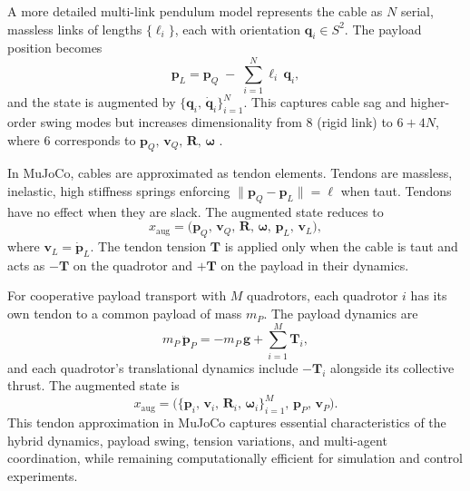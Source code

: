 A more detailed multi-link pendulum model represents the cable as \(N\) serial, massless links of lengths \(\{\ell_{i}\}\), each with orientation \(\mathbf{q}_{i}\in S^{2}\). The payload position becomes
\[
\mathbf{p}_{L} 
= \mathbf{p}_{Q} \;-\; \sum_{i=1}^{N}\ell_{i}\,\mathbf{q}_{i},
\]
and the state is augmented by \(\{\mathbf{q}_{i},\,\dot{\mathbf{q}}_{i}\}_{i=1}^{N}\). This captures cable sag and higher-order swing modes but increases dimensionality from 8 (rigid link) to \(6 + 4N\), where 6 corresponds to \(\mathbf{p}_{Q},\,\mathbf{v}_{Q},\,\mathbf{R},\,\boldsymbol{\omega}\) \cite{goodarzi_dynamics_2015}.

In MuJoCo, cables are approximated as tendon elements. Tendons are massless, inelastic, high stiffness springs enforcing \(\|\mathbf{p}_{Q}-\mathbf{p}_{L}\| = \ell\) when taut. Tendons have no effect when they are slack. The augmented state reduces to
\[
x_{\mathrm{aug}} 
= \bigl(\mathbf{p}_{Q},\,\mathbf{v}_{Q},\,\mathbf{R},\,\boldsymbol{\omega},\,\mathbf{p}_{L},\,\mathbf{v}_{L}\bigr),
\]
where \(\mathbf{v}_{L} = \dot{\mathbf{p}}_{L}\). The tendon tension \(\mathbf{T}\) is applied only when the cable is taut and acts as \(-\mathbf{T}\) on the quadrotor and \(+\mathbf{T}\) on the payload in their dynamics.

For cooperative payload transport with \(M\) quadrotors, each quadrotor \(i\) has its own tendon to a common payload of mass \(m_{P}\). The payload dynamics are
\[
m_{P}\,\ddot{\mathbf{p}}_{P} 
= -m_{P}\,\mathbf{g} 
+ \sum_{i=1}^{M}\mathbf{T}_{i},
\]
and each quadrotor's translational dynamics include \(-\mathbf{T}_{i}\) alongside its collective thrust. The augmented state is
\[
x_{\mathrm{aug}} 
= \bigl(\{\mathbf{p}_{i},\,\mathbf{v}_{i},\,\mathbf{R}_{i},\,\boldsymbol{\omega}_{i}\}_{i=1}^{M},\,\mathbf{p}_{P},\,\mathbf{v}_{P}\bigr).
\]
This tendon approximation in MuJoCo captures essential characteristics of the hybrid dynamics, payload swing, tension variations, and multi-agent coordination, while remaining computationally efficient for simulation and control experiments.